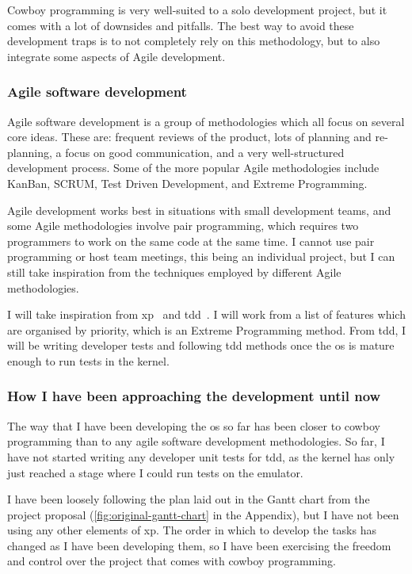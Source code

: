 \documentclass{article}
\begin{document}
Cowboy programming is very well-suited to a solo development project, but it
comes with a lot of downsides and pitfalls. The best way to avoid these
development traps is to not completely rely on this methodology, but to also
integrate some aspects of Agile development.

\subsubsection{Agile software development}
\label{sec:agile_sw_dev}
Agile software development is a group of methodologies which all focus on
several core ideas. These are: frequent reviews of the product, lots of
planning and re-planning, a focus on good communication, and a very
well-structured development process. Some of the more popular Agile
methodologies include KanBan, SCRUM, Test Driven Development, and Extreme
Programming.

Agile development works best in situations with small development teams, and
some Agile methodologies involve pair programming, which requires two
programmers to work on the same code at the same time. I cannot use pair
programming or host team meetings, this being an individual project, but I can
still take inspiration from the techniques employed by different Agile
methodologies.

I will take inspiration from \gls{xp}~\cite{extreme-programming} and
\gls{tdd}~\cite{test-driven-development}. I will work from a list
of features which are organised by priority, which is an Extreme Programming
method. From \gls{tdd}, I will be writing developer tests and following
\gls{tdd} methods once the \gls{os} is mature enough to run tests in the
kernel.

\subsubsection{How I have been approaching the development until now}
The way that I have been developing the \gls{os} so far has been closer to
cowboy programming than to any agile software development methodologies. So
far, I have not started writing any developer unit tests for \gls{tdd}, as the
kernel has only just reached a stage where I could run tests on the emulator.

I have been loosely following the plan laid out in the Gantt chart from the
project proposal (\autoref{fig:original-gantt-chart} in the Appendix), but I
have not been using any other elements of \gls{xp}. The order in which to
develop the tasks has changed as I have been developing them, so I have been
exercising the freedom and control over the project that comes with cowboy
programming.
\end{document}
